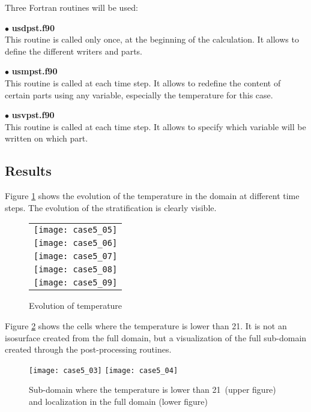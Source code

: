 Three Fortran routines will be used:

$\bullet$ {\bfseries usdpst.f90}\\
This routine is called only once, at the beginning of the calculation. It allows
to define the different writers and parts.

$\bullet$ {\bfseries usmpst.f90}\\
This routine is called at each time step. It allows to redefine the content of
certain parts using any variable, especially the temperature for this case.

$\bullet$ {\bfseries usvpst.f90}\\
This routine is called at each time step. It allows to specify which variable
will be written on which part.


        \subsection{Results}

Figure \ref{fige2_e5} shows the evolution of the temperature in the domain at
different time steps. The evolution of the stratification is clearly visible.


\begin{figure}
\begin{center}
\begin{tabular}{c}
\texttt{[image: case5\_05]} \\
\texttt{[image: case5\_06]} \\
\texttt{[image: case5\_07]} \\
\texttt{[image: case5\_08]} \\
\texttt{[image: case5\_09]} \\
\end{tabular}
\caption{Evolution of temperature}
\label{fige2_e5}
\end{center}
\end{figure}



Figure \ref{fige4_e5} shows the cells where the temperature
is lower than 21\degresC. It is not an isosurface created from the full domain,
but a visualization of the full sub-domain created through the post-processing
routines.

\begin{figure}[h!]
\begin{center}
\texttt{[image: case5\_03]}
\texttt{[image: case5\_04]}
\caption{Sub-domain where the temperature is lower than 21\degresC\ (upper figure)
and localization in the full domain (lower figure)}
\label{fige4_e5}
\end{center}
\end{figure}
